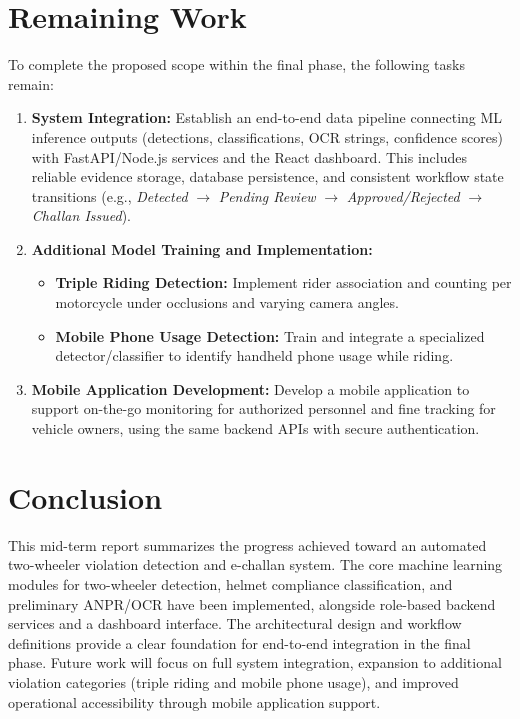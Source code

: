\documentclass[12pt,a4paper]{article}
\begin{document}
\section{Remaining Work}
To complete the proposed scope within the final phase, the following tasks remain:
\begin{enumerate}
  \item \textbf{System Integration:} Establish an end-to-end data pipeline connecting ML inference outputs (detections, classifications, OCR strings, confidence scores) with FastAPI/Node.js services and the React dashboard. This includes reliable evidence storage, database persistence, and consistent workflow state transitions (e.g., \textit{Detected} $\rightarrow$ \textit{Pending Review} $\rightarrow$ \textit{Approved/Rejected} $\rightarrow$ \textit{Challan Issued}).
  \item \textbf{Additional Model Training and Implementation:}
  \begin{itemize}
    \item \textbf{Triple Riding Detection:} Implement rider association and counting per motorcycle under occlusions and varying camera angles.
    \item \textbf{Mobile Phone Usage Detection:} Train and integrate a specialized detector/classifier to identify handheld phone usage while riding.
  \end{itemize}
  \item \textbf{Mobile Application Development:} Develop a mobile application to support on-the-go monitoring for authorized personnel and fine tracking for vehicle owners, using the same backend APIs with secure authentication.
\end{enumerate}

\section{Conclusion}
This mid-term report summarizes the progress achieved toward an automated two-wheeler violation detection and e-challan system. The core machine learning modules for two-wheeler detection, helmet compliance classification, and preliminary ANPR/OCR have been implemented, alongside role-based backend services and a dashboard interface. The architectural design and workflow definitions provide a clear foundation for end-to-end integration in the final phase. Future work will focus on full system integration, expansion to additional violation categories (triple riding and mobile phone usage), and improved operational accessibility through mobile application support.
\end{document}
